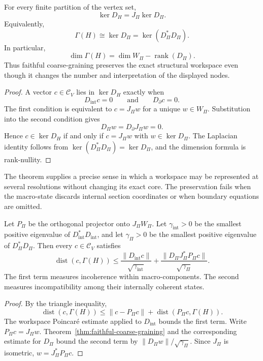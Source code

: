 \begin{theorem}\label{thm:faithful-coarse-graining}
For every finite partition of the vertex set,
\[
\boxed{
\ker D_H
=
J_\Pi\ker D_\Pi.
}
\]
Equivalently,
\[
\boxed{
\Gamma(H)
\cong
\ker D_\Pi
=
\ker(D_\Pi^*D_\Pi).
}
\]
In particular,
\[
\dim\Gamma(H)
=
\dim W_\Pi-\operatorname{rank}(D_\Pi).
\]
Thus faithful coarse-graining preserves the exact structural workspace even
though it changes the number and interpretation of the displayed nodes.
\end{theorem}

\begin{proof}
A vector \(c\in\mathcal C_V\) lies in \(\ker D_H\) exactly when
\[
D_{\mathrm{int}}c=0
\qquad\text{and}\qquad
D_{\partial}c=0.
\]
The first condition is equivalent to \(c=J_\Pi w\) for a unique
\(w\in W_\Pi\). Substitution into the second condition gives
\[
D_\Pi w
=
D_{\partial}J_\Pi w
=0.
\]
Hence \(c\in\ker D_H\) if and only if
\(c=J_\Pi w\) with \(w\in\ker D_\Pi\). The Laplacian identity follows from
\(\ker(D_\Pi^*D_\Pi)=\ker D_\Pi\), and the dimension formula is rank-nullity.
\end{proof}

The theorem supplies a precise sense in which a workspace may be represented
at several resolutions without changing its exact core. The preservation
fails when the macro-state discards internal section coordinates or when
boundary equations are omitted.

\begin{corollary}\label{cor:two-scale-decomposition}
Let \(P_\Pi\) be the orthogonal projector onto \(J_\Pi W_\Pi\). Let
\(\gamma_{\mathrm{int}}>0\) be the smallest positive eigenvalue of
\(D_{\mathrm{int}}^*D_{\mathrm{int}}\), and let
\(\gamma_\Pi>0\) be the smallest positive eigenvalue of
\(D_\Pi^*D_\Pi\). Then every \(c\in\mathcal C_V\) satisfies
\[
\boxed{
\operatorname{dist}(c,\Gamma(H))
\leq
\frac{\|D_{\mathrm{int}}c\|}{\sqrt{\gamma_{\mathrm{int}}}}
+
\frac{
\|D_\Pi J_\Pi^*P_\Pi c\|
}{\sqrt{\gamma_\Pi}}.
}
\]
The first term measures incoherence within macro-components. The second
measures incompatibility among their internally coherent states.
\end{corollary}

\begin{proof}
By the triangle inequality,
\[
\operatorname{dist}(c,\Gamma(H))
\leq
\|c-P_\Pi c\|
+
\operatorname{dist}(P_\Pi c,\Gamma(H)).
\]
The workspace Poincar\'e estimate applied to \(D_{\mathrm{int}}\) bounds the
first term. Write \(P_\Pi c=J_\Pi w\). Theorem~\ref{thm:faithful-coarse-graining}
and the corresponding estimate for \(D_\Pi\) bound the second term by
\(\|D_\Pi w\|/\sqrt{\gamma_\Pi}\). Since \(J_\Pi\) is isometric,
\(w=J_\Pi^*P_\Pi c\).
\end{proof}


